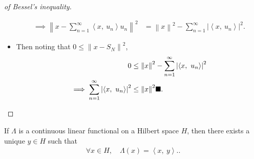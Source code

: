 \begin{proof}[of Bessel's inequality]
\begin{itemize}
\begin{align*}
  \implies 
  {\left\lVert {x - \sum_{n=1}^\infty {\left\langle {x},~{u_{n}} \right\rangle} u_{n}} \right\rVert}^2 &= {\left\lVert {x} \right\rVert}^2 - 
  \sum_{n=1}^\infty {\left\lvert {{\left\langle {x},~{u_{n}} \right\rangle}} \right\rvert}^2
  .\end{align*}
\item
  Then noting that \(0 \leq {\left\lVert {x - S_{N}} \right\rVert}^2\),
  \begin{align*}
  0 &\leq 
  {\left\lVert {x} \right\rVert}^2 - 
  \sum_{n=1}^\infty {\left\lvert {{\left\langle {x},~{u_{n}} \right\rangle}} \right\rvert}^2 \\
  \implies 
  \sum_{n=1}^\infty {\left\lvert {{\left\langle {x},~{u_{n}} \right\rangle}} \right\rvert}^2 &\leq 
  {\left\lVert {x} \right\rVert}^2 \hfill\blacksquare
  .\end{align*}
\end{itemize}

\end{proof}

\begin{theorem}

If \(\Lambda\) is a continuous linear functional on a Hilbert space
\(H\), then there exists a unique \(y \in H\) such that
\begin{align*}
\forall x\in H,\quad \Lambda(x) = {\left\langle {x},~{y} \right\rangle}.
.\end{align*}

\end{theorem}

